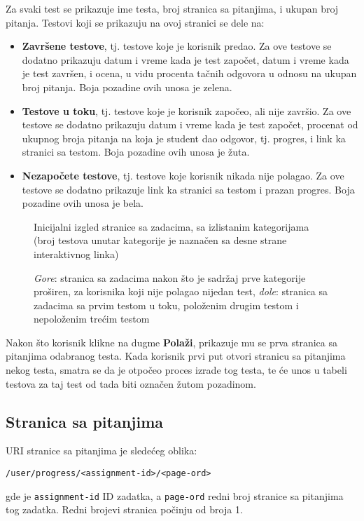 Za svaki test se prikazuje ime testa, broj stranica sa pitanjima, i ukupan broj pitanja. Testovi koji se prikazuju na ovoj stranici se dele na:
\begin{itemize}
\renewcommand\labelitemi{--}
\item \textbf{Završene testove}, tj. testove koje je korisnik predao. Za ove testove se dodatno prikazuju datum i vreme kada je test započet, datum i vreme kada je test završen, i ocena, u vidu procenta tačnih odgovora u odnosu na ukupan broj pitanja. Boja pozadine ovih unosa je zelena.
\item \textbf{Testove u toku}, tj. testove koje je korisnik započeo, ali nije završio. Za ove testove se dodatno prikazuju datum i vreme kada je test započet, procenat od ukupnog broja pitanja na koja je student dao odgovor, tj. progres, i link ka stranici sa testom. Boja pozadine ovih unosa je žuta.
\item \textbf{Nezapočete testove}, tj. testove koje korisnik nikada nije polagao. Za ove testove se dodatno prikazuje link ka stranici sa testom i prazan progres. Boja pozadine ovih unosa je bela.
\end{itemize}
\begin{figure}[p]
\centering
{}
\caption{Inicijalni izgled stranice sa zadacima, sa izlistanim kategorijama (broj testova unutar kategorije je naznačen sa desne strane interaktivnog linka)}
\label{fig:assignments}
\end{figure}
\begin{figure}[p]
\centering
{}
\caption{\textit{Gore}: stranica sa zadacima nakon što je sadržaj prve kategorije proširen, za korisnika koji nije polagao nijedan test, \textit{dole}: stranica sa zadacima sa prvim testom u toku, položenim drugim testom i nepoloženim trećim testom}
\label{fig:assignments-collapsed}
\end{figure}

Nakon što korisnik klikne na dugme \textbf{Polaži}, prikazuje mu se prva stranica sa pitanjima odabranog testa. Kada korisnik prvi put otvori stranicu sa pitanjima nekog testa, smatra se da je otpočeo proces izrade tog testa, te će unos u tabeli testova za taj test od tada biti označen žutom pozadinom.

\subsection{Stranica sa pitanjima}
\label{section:submit}
URI stranice sa pitanjima je sledećeg oblika:
\begin{verbatim}
/user/progress/<assignment-id>/<page-ord>
\end{verbatim}
gde je \texttt{assignment-id} ID zadatka, a \texttt{page-ord} redni broj stranice sa pitanjima tog zadatka. Redni brojevi stranica počinju od broja 1.


